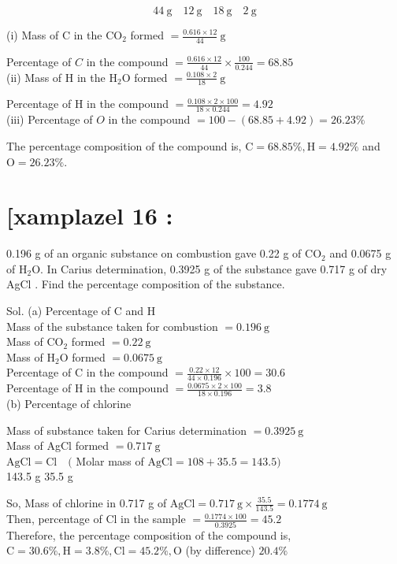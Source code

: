 \documentclass[10pt]{article}
\begin{document}
$$
44 \mathrm{~g} \quad 12 \mathrm{~g} \quad 18 \mathrm{~g} \quad 2 \mathrm{~g}
$$

(i) Mass of C in the $\mathrm{CO}_{2}$ formed $=\frac{0.616 \times 12}{44} \mathrm{~g}$

Percentage of $C$ in the compound $=\frac{0.616 \times 12}{44} \times \frac{100}{0.244}=68.85$\\
(ii) Mass of H in the $\mathrm{H}_{2} \mathrm{O}$ formed $=\frac{0.108 \times 2}{18} \mathrm{~g}$

Percentage of H in the compound $=\frac{0.108 \times 2 \times 100}{18 \times 0.244}=4.92$\\
(iii) Percentage of $O$ in the compound $=100-(68.85+4.92)=26.23 \%$

The percentage composition of the compound is, $\mathrm{C}=68.85 \%, \mathrm{H}=4.92 \%$ and $\mathrm{O}=26.23 \%$.

\section*{[xamplazel 16 :}
0.196 g of an organic substance on combustion gave 0.22 g of $\mathrm{CO}_{2}$ and 0.0675 g of $\mathrm{H}_{2} \mathrm{O}$. In Carius determination, 0.3925 g of the substance gave 0.717 g of dry AgCl . Find the percentage composition of the substance.

Sol. (a) Percentage of C and H\\
Mass of the substance taken for combustion $=0.196 \mathrm{~g}$\\
Mass of $\mathrm{CO}_{2}$ formed $=0.22 \mathrm{~g}$\\
Mass of $\mathrm{H}_{2} \mathrm{O}$ formed $=0.0675 \mathrm{~g}$\\
Percentage of C in the compound $=\frac{0.22 \times 12}{44 \times 0.196} \times 100=30.6$\\
Percentage of H in the compound $=\frac{0.0675 \times 2 \times 100}{18 \times 0.196}=3.8$\\
(b) Percentage of chlorine

Mass of substance taken for Carius determination $=0.3925 \mathrm{~g}$\\
Mass of AgCl formed $=0.717 \mathrm{~g}$\\
$\mathrm{AgCl}=\mathrm{Cl} \quad($ Molar mass of $\mathrm{AgCl}=108+35.5=143.5)$\\
143.5 g 35.5 g

So, Mass of chlorine in 0.717 g of $\mathrm{AgCl}=0.717 \mathrm{~g} \times \frac{35.5}{143.5}=0.1774 \mathrm{~g}$\\
Then, percentage of Cl in the sample $=\frac{0.1774 \times 100}{0.3925}=45.2$\\
Therefore, the percentage composition of the compound is, $\mathrm{C}=30.6 \%, \mathrm{H}=3.8 \%, \mathrm{Cl}=45.2 \%, \mathrm{O}$ (by difference) $20.4 \%$
\end{document}
